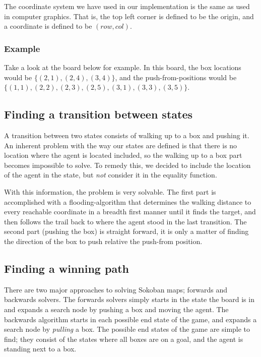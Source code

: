 \documentclass[a4paper,11pt]{article}
\begin{document}
The coordinate system we have used in our implementation is the same as used in computer graphics.
That is, the top left corner is defined to be the origin, and a coordinate is defined to be
$(row, col)$. 

\subsubsection{Example}
Take a look at the board below for example.
In this board, the box locations would be
$\{(2, 1), (2, 4), (3, 4)\}$,
and the push-from-positions would be
$\{(1,1), (2,2), (2,3), (2,5), (3,1), (3,3), (3,5)\} $.


\subsection{Finding a transition between states}

A transition between two states consists of walking up to a box and pushing it.
An inherent problem with the way our states are defined is that there is no location
where the agent is located included, so the walking up to a box part becomes impossible to solve.
To remedy this, we decided to include the location of the agent in the state,
but \emph{not} consider it in the equality function.

With this information, the problem is very solvable.
The first part is accomplished with a flooding-algorithm that
determines the walking distance to every reachable coordinate in a breadth
first manner until it finds the target, and then follows the trail back to
where the agent stood in the last transition.
The second part (pushing the box) is straight forward, it is only a matter 
of finding the direction of the box to push relative the push-from position.

\subsection{Finding a winning path}

There are two major approaches to solving Sokoban maps; forwards and backwards solvers.
The forwards solvers simply starts in the state the board is in and expands a search node
by pushing a box and moving the agent.
The backwards algorithm starts in each possible end state of the game,
and expands a search node by \emph{pulling} a box.
The possible end states of the game are simple to find;
they consist of the states where all boxes are on a goal, and the agent
is standing next to a box.
\end{document}
